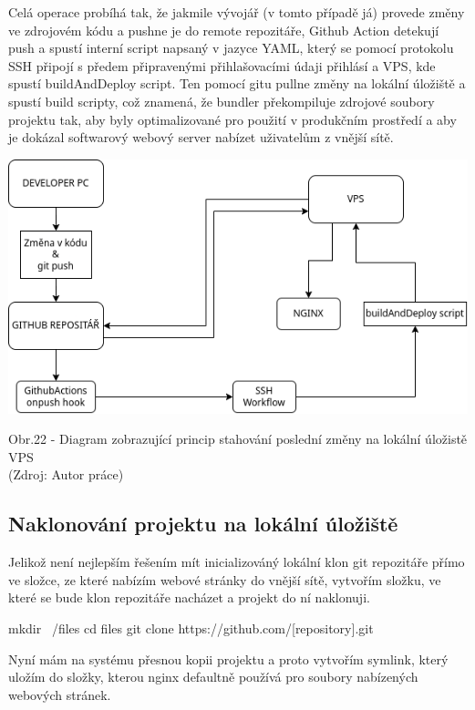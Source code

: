 \documentclass[12pt,a4paper]{report}
\begin{document}
  Celá operace probíhá tak, že jakmile vývojář (v tomto případě já) provede změny ve zdrojovém kódu
  a pushne je do remote repozitáře, Github Action detekují push a spustí interní script napsaný
  v jazyce YAML, který se pomocí protokolu SSH připojí s předem připravenými přihlašovacími
  údaji přihlásí a VPS, kde spustí buildAndDeploy script. Ten pomocí gitu pullne změny na lokální úložiště 
  a spustí build scripty, což znamená, že bundler překompiluje zdrojové soubory projektu tak, aby byly 
  optimalizované pro použití v produkčním prostředí a aby je dokázal softwarový webový server nabízet uživatelům z vnější sítě.
  
  \vspace*{0.5cm}
  \noindent\includegraphics[width=\linewidth]{CIDC_visualization.png}
  \begin{center}
    Obr.22 - Diagram zobrazující princip stahování poslední změny na lokální úložistě VPS \\
    (Zdroj: Autor práce)
  \end{center}
  \vspace*{0.5cm}

  \subsection{Naklonování projektu na lokální úložiště}
  Jelikož není nejlepším řešením mít inicializováný lokální klon git repozitáře přímo ve složce, ze které 
  nabízím webové stránky do vnější sítě, vytvořím složku, ve které se bude klon repozitáře nacházet a projekt do ní naklonuji.
  \begin{bash}
    mkdir ~/files
    cd files
    git clone https://github.com/[repository].git 
  \end{bash}
  
  Nyní mám na systému přesnou kopii projektu a proto vytvořím symlink, který uložím do složky,
  kterou nginx defaultně používá pro soubory nabízených webových stránek.
\end{document}
